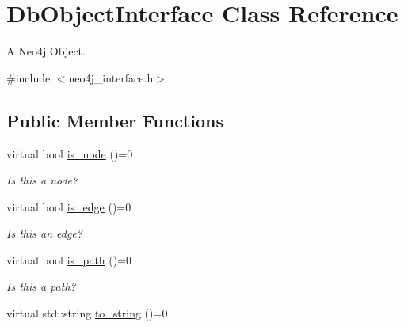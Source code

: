 \hypertarget{classDbObjectInterface}{\section{Db\-Object\-Interface Class Reference}
\label{classDbObjectInterface}
}


A Neo4j Object.  




{\ttfamily \#include $<$neo4j\-\_\-interface.\-h$>$}

\subsection*{Public Member Functions}
\begin{DoxyCompactItemize}
\item 
virtual bool \hyperlink{classDbObjectInterface_a3c1c9af939a1e038a082930e57c2afca}{is\-\_\-node} ()=0
\begin{DoxyCompactList}\small\item\em Is this a node? \end{DoxyCompactList}\item 
virtual bool \hyperlink{classDbObjectInterface_af2ab883d4af94b4e7bd25a117bb1f39b}{is\-\_\-edge} ()=0
\begin{DoxyCompactList}\small\item\em Is this an edge? \end{DoxyCompactList}\item 
virtual bool \hyperlink{classDbObjectInterface_ad4ec7a23a86d18fea543376dc6bf6c56}{is\-\_\-path} ()=0
\begin{DoxyCompactList}\small\item\em Is this a path? \end{DoxyCompactList}\item 
\hypertarget{classDbObjectInterface_a93c98f06ce3f5493525dd19b337cebbc}{virtual std\-::string \hyperlink{classDbObjectInterface_a93c98f06ce3f5493525dd19b337cebbc}{to\-\_\-string} ()=0}\label{classDbObjectInterface_a93c98f06ce3f5493525dd19b337cebbc}


\end{DoxyCompactItemize}

